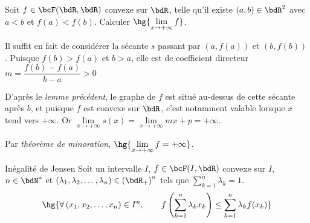 \documentclass[a4paper,french,bookmarks]{article}
\begin{document}
\begin{exercise}{}{}
    Soit $f \in \bcF(\bdR, \bdR)$ convexe sur $\bdR$, telle qu'il existe $(a, b) \in \bdR^2$ avec $a < b$ et $f(a) < f(b)$. Calculer $\hg{\lim\limits_{x \to +\infty} f}$.
    
    \begin{enumerate}
        \itt Il suffit en fait de considérer la sécante $s$ passant par $\left(a, f(a)\right)$ et $\left(b, f(b)\right)$. Puisque $f(b) > f(a)$ et $b > a$, elle est de coefficient directeur $m = \dfrac{f(b)-f(a)}{b-a} > 0$
        
        \itt D'après le \textit{lemme précédent}, le graphe de $f$ est situé au-dessus de cette sécante après $b$, et puisque $f$ est convexe sur $\bdR$, c'est notamment valable lorsque $x$ tend vers $+\infty$. Or $\lim\limits_{x \to +\infty} s(x) = \lim\limits_{x \to +\infty} mx + p = +\infty$.
        
        \itt Par \textit{théorème de minoration}, $\hg{\lim\limits_{x \to +\infty} f = +\infty}$.
    \end{enumerate}
\end{exercise}

\newpage

\begin{theorem}{Inégalité de Jensen}{}
    Soit un intervalle $I$, $f \in \bcF(I, \bdR)$ convexe sur $I$, $n \in \bdN^*$ et $\left(\lambda_1, \lambda_2, \dots, \lambda_n\right) \in \left(\bdR_+\right)^n$ tels que $ \sum_{k=1}^n \lambda_k = 1$.
    \[ \hg{\forall \left(x_1, x_2, \dots, x_n\right) \in I^n,\qquad f\left(\sum_{k=1}^n \lambda_kx_k\right) \leq \sum_{k=1}^n \lambda_kf(x_k)}\]
\end{theorem}
    
\end{document}
